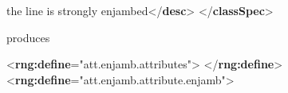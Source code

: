 \begin{shaded}
\hspace*{1em}\hspace*{1em}\hspace*{1em}\hspace*{1em}\mbox{}\newline 
\hspace*{1em}\hspace*{1em}\hspace*{1em}\hspace*{1em}the line is strongly enjambed{</\textbf{desc}>}\mbox{}\newline 
\hspace*{1em}\hspace*{1em}\hspace*{1em}\mbox{}\newline 
\hspace*{1em}\hspace*{1em}\mbox{}\newline 
\hspace*{1em}\mbox{}\newline 
{}\mbox{}\newline 
{</\textbf{classSpec}>}\end{shaded}\egroup\par \noindent  produces \par\bgroup\exampleFont \begin{shaded}\noindent\mbox{}{<\textbf{rng:define}\hspace*{1em}{name}="{att.enjamb.attributes}">}\mbox{}\newline 
{}\mbox{}\newline 
{}\mbox{}\newline 
{</\textbf{rng:define}>}\mbox{}\newline 
{<\textbf{rng:define}\hspace*{1em}{name}="{att.enjamb.attribute.enjamb}">}\mbox{}\newline 

\end{shaded}
